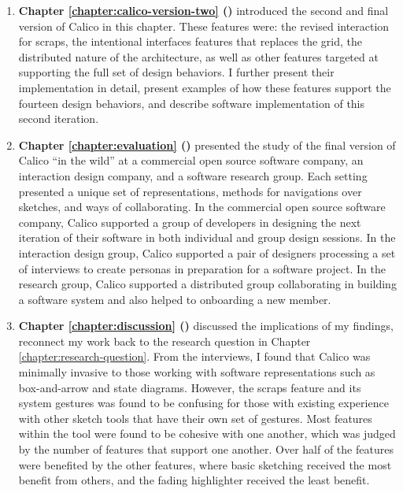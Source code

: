 \begin{enumerate}
   \item \textbf{Chapter \ref{chapter:calico-version-two} ()} introduced the second and final version of Calico in this chapter. These features were: the revised interaction for scraps, the intentional interfaces features that replaces the grid, the distributed nature of the architecture, as well as other features targeted at supporting the full set of design behaviors. I further present their implementation in detail, present examples of how these features support the fourteen design behaviors, and describe software implementation of this second iteration.

   \item \textbf{Chapter \ref{chapter:evaluation} ()} presented the study of the final version of Calico ``in the wild'' at a commercial open source software company, an interaction design company, and a software research group. Each setting presented a unique set of representations, methods for navigations over sketches, and ways of collaborating. In the commercial open source software company, Calico supported a group of developers in designing the next iteration of their software in both individual and group design sessions. In the interaction design group, Calico supported a pair of designers processing a set of interviews to create personas in preparation for a software project. In the research group, Calico supported a distributed group collaborating in building a software system and also helped to onboarding a new member.

   \item \textbf{Chapter \ref{chapter:discussion} ()} discussed the implications of my findings, reconnect my work back to the research question in Chapter \ref{chapter:research-question}. From the interviews, I found that Calico was minimally invasive to those working with software representations such as box-and-arrow and state diagrams. However, the scraps feature and its system gestures was found to be confusing for those with existing experience with other sketch tools that have their own set of gestures. Most features within the tool were found to be cohesive with one another, which was judged by the number of features that support one another. Over half of the features were benefited by the other features, where basic sketching received the most benefit from others, and the fading highlighter received the least benefit. 
   

\end{enumerate}
